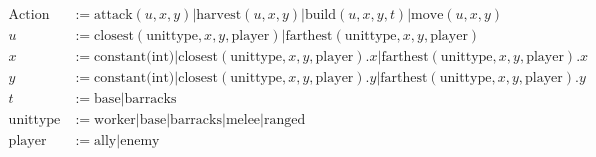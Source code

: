 \begin{align*}
    \text{Action} & := \text{attack}(u, x, y) | \text{harvest}(u, x, y) | \text{build}(u, x, y, t) | \text{move}(u, x, y) \\
    u & := \text{closest}(\text{unittype}, x, y, \text{player}) | \text{farthest}(\text{unittype}, x, y, \text{player}) \\
    x & := \text{constant(int)} | \text{closest}(\text{unittype}, x, y, \text{player}).x | \text{farthest}(\text{unittype}, x, y, \text{player}).x \\
    y & := \text{constant(int)} | \text{closest}(\text{unittype}, x, y, \text{player}).y | \text{farthest}(\text{unittype}, x, y, \text{player}).y \\
    t & := \text{base} | \text{barracks} \\
    \text{unittype} & := \text{worker} | \text{base} | \text{barracks} | \text{melee} | \text{ranged} \\
    \text{player} & := \text{ally} | \text{enemy} \\
\end{align*}
